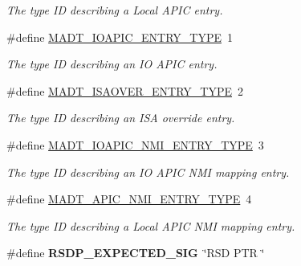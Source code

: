 \begin{DoxyCompactItemize}
\begin{DoxyCompactList}\small\item\em The type ID describing a Local A\+P\+IC entry. \end{DoxyCompactList}\item 
\#define \hyperlink{group__acpi__tables_ga54e37abd2949fc4936336e15f7ece36e}{M\+A\+D\+T\+\_\+\+I\+O\+A\+P\+I\+C\+\_\+\+E\+N\+T\+R\+Y\+\_\+\+T\+Y\+PE}~1\hypertarget{group__acpi__tables_ga54e37abd2949fc4936336e15f7ece36e}{}\label{group__acpi__tables_ga54e37abd2949fc4936336e15f7ece36e}

\begin{DoxyCompactList}\small\item\em The type ID describing an IO A\+P\+IC entry. \end{DoxyCompactList}\item 
\#define \hyperlink{group__acpi__tables_ga9a6500faec01151b8eef68c166d4df3f}{M\+A\+D\+T\+\_\+\+I\+S\+A\+O\+V\+E\+R\+\_\+\+E\+N\+T\+R\+Y\+\_\+\+T\+Y\+PE}~2\hypertarget{group__acpi__tables_ga9a6500faec01151b8eef68c166d4df3f}{}\label{group__acpi__tables_ga9a6500faec01151b8eef68c166d4df3f}

\begin{DoxyCompactList}\small\item\em The type ID describing an I\+SA override entry. \end{DoxyCompactList}\item 
\#define \hyperlink{group__acpi__tables_gad57bae5714fff09d0fe04463af1e1276}{M\+A\+D\+T\+\_\+\+I\+O\+A\+P\+I\+C\+\_\+\+N\+M\+I\+\_\+\+E\+N\+T\+R\+Y\+\_\+\+T\+Y\+PE}~3\hypertarget{group__acpi__tables_gad57bae5714fff09d0fe04463af1e1276}{}\label{group__acpi__tables_gad57bae5714fff09d0fe04463af1e1276}

\begin{DoxyCompactList}\small\item\em The type ID describing an IO A\+P\+IC N\+MI mapping entry. \end{DoxyCompactList}\item 
\#define \hyperlink{group__acpi__tables_ga31bb8a84c0d4021d0350d4e0eaa0aa56}{M\+A\+D\+T\+\_\+\+A\+P\+I\+C\+\_\+\+N\+M\+I\+\_\+\+E\+N\+T\+R\+Y\+\_\+\+T\+Y\+PE}~4\hypertarget{group__acpi__tables_ga31bb8a84c0d4021d0350d4e0eaa0aa56}{}\label{group__acpi__tables_ga31bb8a84c0d4021d0350d4e0eaa0aa56}

\begin{DoxyCompactList}\small\item\em The type ID describing a Local A\+P\+IC N\+MI mapping entry. \end{DoxyCompactList}\item 
\#define {\bfseries R\+S\+D\+P\+\_\+\+E\+X\+P\+E\+C\+T\+E\+D\+\_\+\+S\+IG}~\char`\"{}R\+SD P\+TR \char`\"{}\hypertarget{group__acpi__tables_gafd3356898382d440865ce48370f23034}{}\label{group__acpi__tables_gafd3356898382d440865ce48370f23034}


\end{DoxyCompactItemize}
